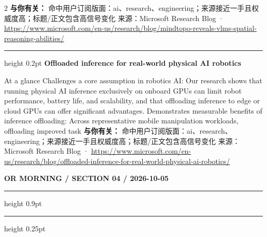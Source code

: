 \documentclass[10.5pt]{ctexart}
\begin{document}
\begin{multicols}{2}
\textbf{与你有关：} 命中用户订阅版面：ai、research、engineering；来源接近一手且权威度高；标题/正文包含高信号变化
{\footnotesize\color{ormuted} 来源：Microsoft Research Blog · \url{https://www.microsoft.com/en-us/research/blog/mindtopo-reveals-vlms-spatial-reasoning-abilities/}}
\vspace{2mm}
\hrule height 0.2pt
\vspace{2mm}
{\large\bfseries Offloaded inference for real-world physical AI robotics}\par
At a glance Challenges a core assumption in robotics AI: Our research shows that running physical AI inference exclusively on onboard GPUs can limit robot performance, battery life, and scalability, and that offloading inference to edge or cloud GPUs can offer significant advantages. Demonstrates measurable benefits of inference offloading: Across representative mobile manipulation workloads, offloading improved task
\textbf{与你有关：} 命中用户订阅版面：ai、research、engineering；来源接近一手且权威度高；标题/正文包含高信号变化
{\footnotesize\color{ormuted} 来源：Microsoft Research Blog · \url{https://www.microsoft.com/en-us/research/blog/offloaded-inference-for-real-world-physical-ai-robotics/}}
\end{multicols}
\newpage
{\small\bfseries OR MORNING / SECTION 04 / 2026-10-05}
\vspace{2mm}
\hrule height 0.9pt
\vspace{1.5mm}
\hrule height 0.25pt
\vspace{4mm}
\end{document}
